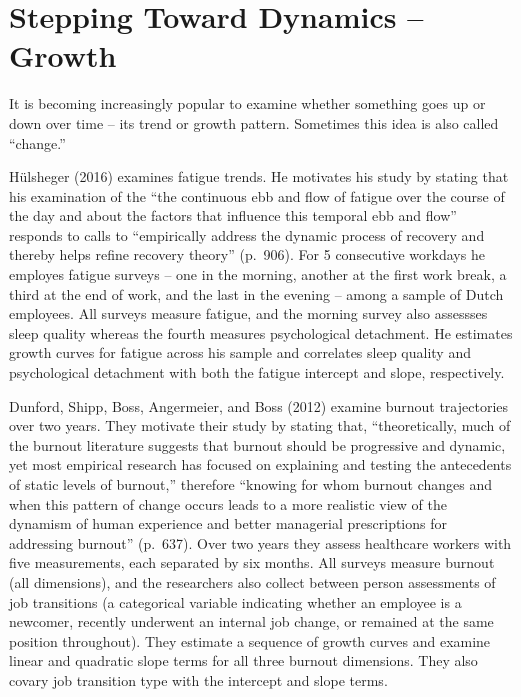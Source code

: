 \documentclass[english,,man]{apa6}
\theoremstyle{definition}
\theoremstyle{definition}
\theoremstyle{definition}
\theoremstyle{remark}
\begin{document}
\hypertarget{stepping-toward-dynamics-growth}{%
\section{Stepping Toward Dynamics --
Growth}\label{stepping-toward-dynamics-growth}}

It is becoming increasingly popular to examine whether something goes up
or down over time -- its trend or growth pattern. Sometimes this idea is
also called \enquote{change.}

Hülsheger (2016) examines fatigue trends. He motivates his study by
stating that his examination of the \enquote{the continuous ebb and flow
of fatigue over the course of the day and about the factors that
influence this temporal ebb and flow} responds to calls to
\enquote{empirically address the dynamic process of recovery and thereby
helps refine recovery theory} (p.~906). For 5 consecutive workdays he
employes fatigue surveys -- one in the morning, another at the first
work break, a third at the end of work, and the last in the evening --
among a sample of Dutch employees. All surveys measure fatigue, and the
morning survey also assessses sleep quality whereas the fourth measures
psychological detachment. He estimates growth curves for fatigue across
his sample and correlates sleep quality and psychological detachment
with both the fatigue intercept and slope, respectively.

Dunford, Shipp, Boss, Angermeier, and Boss (2012) examine burnout
trajectories over two years. They motivate their study by stating that,
\enquote{theoretically, much of the burnout literature suggests that
burnout should be progressive and dynamic, yet most empirical research
has focused on explaining and testing the antecedents of static levels
of burnout,} therefore \enquote{knowing for whom burnout changes and
when this pattern of change occurs leads to a more realistic view of the
dynamism of human experience and better managerial prescriptions for
addressing burnout} (p.~637). Over two years they assess healthcare
workers with five measurements, each separated by six months. All
surveys measure burnout (all dimensions), and the researchers also
collect between person assessments of job transitions (a categorical
variable indicating whether an employee is a newcomer, recently
underwent an internal job change, or remained at the same position
throughout). They estimate a sequence of growth curves and examine
linear and quadratic slope terms for all three burnout dimensions. They
also covary job transition type with the intercept and slope terms.
\end{document}
